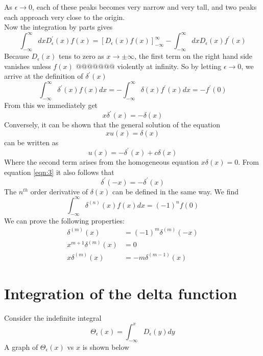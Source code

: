 		
		As $\epsilon \rightarrow 0$, each of these peaks becomes very narrow and very tall, and two peaks each approach very close to the origin. \\
		Now the integration by parts gives
		\begin{equation}
			\int_{-\infty}^{\infty} dx D_\epsilon^\prime(x) f(x) = \left[D_\epsilon(x) f(x)\right]_{-\infty}^{\infty} - \int_{-\infty}^{\infty} dx D_\epsilon(x) f^\prime(x)
		\end{equation}
		Because $D_\epsilon(x)$ tens to zero as $x \rightarrow \pm \infty$, the first term on the right hand side vanishes unless $f(x)$ $@@@@@@@$ violently at infinity. So by letting $\epsilon \rightarrow 0$, we arrive at the definition of $\delta^\prime(x)$
		\begin{equation}\label{eqn:3}
			\int_{-\infty}^{\infty} \delta^\prime(x) f(x) dx = - \int_{-\infty}^{\infty} \delta(x) f^\prime(x) dx = - f^\prime(0)
		\end{equation}
		From this we immediately get
		\begin{equation}
			x \delta^\prime(x) = -\delta(x)
		\end{equation}
		Conversely, it can be shown that the general solution of the equation
		\begin{equation}
			x u(x) = \delta(x)
		\end{equation}
		can be written as
		\begin{equation}
			u(x) = -\delta^\prime(x) + c \delta(x)
		\end{equation}
		Where the second term arises from the homogeneous equation $x \delta(x) = 0$.
		From equation  \ref{eqn:3}  it also follows that 
		\begin{equation}
			\delta^\prime(-x) = - \delta^\prime(x)
		\end{equation}
		The $n^{th}$ order derivative of $\delta(x)$ can be defined in the same way. We find
		\begin{equation}
			\int_{-\infty}^{\infty} \delta^{(n)}(x) f(x) dx = (-1)^{n} f(0)
		\end{equation}
		We can prove the following properties:
		\begin{eqnarray}
			\delta^{(m)}(x) &= (-1)^m \delta^{(m)} (-x) \\
			x^{m+1} \delta^{(m)}(x) &= 0 \\
			x\delta^{(m)}(x) &= -m \delta^{(m-1)} (x)
		\end{eqnarray}
		
		
	\section{Integration of the delta function}
		Consider the indefinite integral
		\begin{equation}\label{eqn:4}
			\Theta_\epsilon(x) = \int_{-\infty}^{x}  D_\epsilon(y) dy
		\end{equation}
		A graph of $\Theta_\epsilon(x)$ vs $x$ is shown below
		
